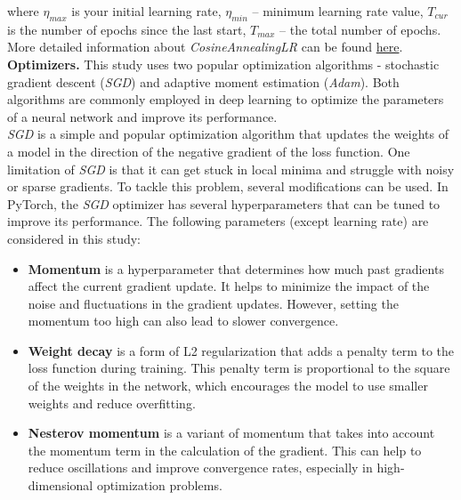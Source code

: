 where $\eta_{max}$ is your initial learning rate, $\eta_{min}$ -- minimum learning rate value, $T_{cur}$ is the number of epochs since the last start, $T_{max}$ -- the total number of epochs. More detailed information about \textit{CosineAnnealingLR} can be found \href{https://pytorch.org/docs/stable/generated/torch.optim.lr_scheduler.CosineAnnealingLR.html}{here}.\\

\textbf{Optimizers.} This study uses two popular optimization algorithms - stochastic gradient descent (\textit{SGD}) and adaptive moment estimation (\textit{Adam}). Both algorithms are commonly employed in deep learning to optimize the parameters of a neural network and improve its performance. \\

\textit{SGD} is a simple and popular optimization algorithm that updates the weights of a model in the direction of the negative gradient of the loss function. One limitation of \textit{SGD} is that it can get stuck in local minima and struggle with noisy or sparse gradients. To tackle this problem, several modifications can be used. In PyTorch, the \textit{SGD} optimizer has several hyperparameters that can be tuned to improve its performance. The following parameters (except learning rate) are considered in this study: 

\begin{itemize}
    \item \textbf{Momentum} is a hyperparameter that determines how much past gradients affect the current gradient update. It helps to minimize the impact of the noise and fluctuations in the gradient updates. However, setting the momentum too high can also lead to slower convergence.
    
    \item  \textbf{Weight decay} is a form of L2 regularization that adds a penalty term to the loss function during training. This penalty term is proportional to the square of the weights in the network, which encourages the model to use smaller weights and reduce overfitting.

    \item \textbf{Nesterov momentum} is a variant of momentum that takes into account the momentum term in the calculation of the gradient. This can help to reduce oscillations and improve convergence rates, especially in high-dimensional optimization problems.
\end{itemize}

